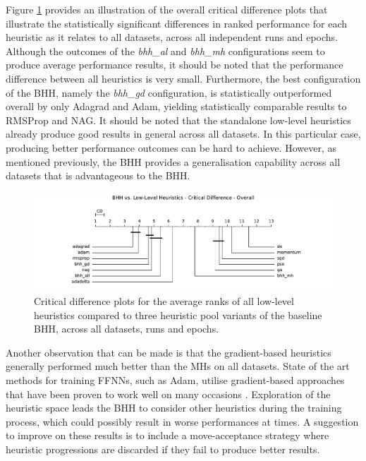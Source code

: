 \documentclass[preprint,review,12pt]{elsarticle}
\begin{document}
Figure \ref{fig:results:standalone:descriptive:cd} provides an illustration of the overall critical difference plots that illustrate the statistically significant differences in ranked performance for each heuristic as it relates to all datasets, across all independent runs and epochs. Although the outcomes of the \textit{bhh\_al} and \textit{bhh\_mh} configurations seem to produce average performance results, it should be noted that the performance difference between all heuristics is very small. Furthermore, the best configuration of the \acs{BHH}, namely the \textit{bhh\_gd} configuration, is statistically outperformed overall by only \acs{Adagrad} and \acs{Adam}, yielding statistically comparable results to \acs{RMSProp} and \acs{NAG}. It should be noted that the standalone low-level heuristics already produce good results in general across all datasets. In this particular case, producing better performance outcomes can be hard to achieve. However, as mentioned previously, the \acs{BHH} provides a generalisation capability across all datasets that is advantageous to the \acs{BHH}.

\begin{figure}[htbp]
	\centering
	\includegraphics[width=\textwidth]{standalone_cd_overall.pdf}
	\caption{Critical difference plots for the average ranks of all low-level heuristics compared to three heuristic pool variants of the baseline \acs{BHH}, across all datasets, runs and epochs.}
	\label{fig:results:standalone:descriptive:cd}
\end{figure}

Another observation that can be made is that the gradient-based heuristics generally performed much better than the \acp{MH} on all datasets. State of the art methods for training \acp{FFNN}, such as \acs{Adam}, utilise gradient-based approaches that have been proven to work well on many occasions \citep{ref:kingma:2014}. Exploration of the heuristic space leads the \acs{BHH} to consider other heuristics during the training process, which could possibly result in worse performances at times. A suggestion to improve on these results is to include a move-acceptance strategy where heuristic progressions are discarded if they fail to produce better results.
\end{document}
